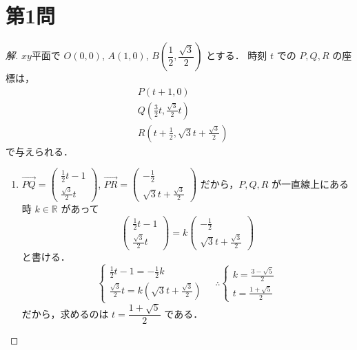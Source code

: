 \documentclass[../main.tex]{subfiles}
\begin{document}
\section*{第1問}

\begin{proof}[解]
  $xy$平面で $O(0,0)$, $A(1,0)$, $B\left(\dfrac{1}{2}, \dfrac{\sqrt{3}}{2}\right)$ とする．
  時刻 $t$ での $P, Q, R$ の座標は，
  \begin{align*}
    &P(t+1, 0) \\
    &Q\left(\frac{3}{2}t, \frac{\sqrt{3}}{2}t\right) \\
    &R\left(t+\frac{1}{2}, \sqrt{3}t+\frac{\sqrt{3}}{2}\right)
  \end{align*}
  で与えられる．

  \begin{center}
  \end{center}

  \begin{enumerate}[(1)]
    \item $\vec{PQ} =
      \begin{pmatrix} \frac{1}{2}t-1 \\ \frac{\sqrt{3}}{2}t
      \end{pmatrix}$, $\vec{PR} =
      \begin{pmatrix} -\frac{1}{2} \\ \sqrt{3}t+\frac{\sqrt{3}}{2}
      \end{pmatrix}$ だから，$P, Q, R$ が一直線上にある時 $k \in \mathbb{R}$ があって
      \[
        \begin{pmatrix} \frac{1}{2}t-1 \\ \frac{\sqrt{3}}{2}t
        \end{pmatrix} = k
        \begin{pmatrix} -\frac{1}{2} \\ \sqrt{3}t+\frac{\sqrt{3}}{2}
        \end{pmatrix}
      \]
      と書ける．
      \[
        \begin{cases}
          \frac{1}{2}t-1 = -\frac{1}{2}k \\
          \frac{\sqrt{3}}{2}t = k \left(\sqrt{3}t + \frac{\sqrt{3}}{2}\right)
        \end{cases}
        \quad \therefore
        \begin{cases}
          k = \frac{3-\sqrt{5}}{2} \\
          t = \frac{1+\sqrt{5}}{2}
        \end{cases}
      \]
      だから，求めるのは $t = \dfrac{1+\sqrt{5}}{2}$ である．


\end{enumerate}
\end{proof}
\end{document}
